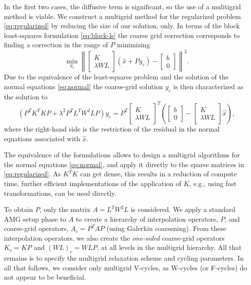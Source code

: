 In the first two cases, the diffusive term is significant, so the use
of a mulitigrid method is viable. We construct a multigrid method for
the regularized problem \eqref{eq:regularized} by reducing the size of
our solution, only. In terms of the block least-squares formulation
\eqref{eq:block-ls} the coarse grid correction corresponds to finding
a correction in the range of $P$ minimizing
\[
\min_{y_c}\left\| \left[\begin{array}{c} K \\ \lambda
      WL\end{array}\right](\hat{x}+Py_c) - \left[\begin{array}{c} b \\ 0 \end{array}\right]\right\|^2.
\]
Due to the equivalence of the least-squares problem and the solution
of the normal equations \eqref{eq:normal} the coarse-grid solution $y_c$ is then characterized as the solution to
\[
\left(P^TK^TKP + \lambda^2P^TL^TW^2LP\right)y_c =
P^T\left[\begin{array}{c} K \\ \lambda WL\end{array}\right]^T
\left(\left[\begin{array}{c} b \\ 0 \end{array}\right] - \left[\begin{array}{c} K \\ \lambda
      WL\end{array}\right]\hat{x}\right),
\]
where the right-hand side is the restriction of the residual in the
normal equations associated with $\hat{x}$.

The equivalence of the formulations allows to design a multigrid
algorithms for the normal equations \eqref{eq:normal}, and apply it
directly to the sparse matrices in \eqref{eq:regularized}. As $K^TK$
can get dense, this results in a reduction of compute time, further
efficient implementations of the application of $K$, e.g., using fast
transformations, can be used directly.

To obtain $P$, only the matrix $A = L^T W^2 L$ is considered. We apply a
standard AMG setup phase to $A$ to create a hierarchy of interpolation
operators, $P$, and coarse-grid operators, $A_c = P^TAP$ (using
Galerkin coarsening).  From these interpolation operators, we also
create the \textit{one-sided} coarse-grid operators $K_c = KP$ and $(WL)_c =
WLP$, at all levels in the multigrid hierarchy. All that remains is to
specify the multigrid relaxation scheme and cycling parameters.  In
all that follows, we consider only multigrid V-cycles, as W-cycles (or
F-cycles) do not appear to be beneficial.

